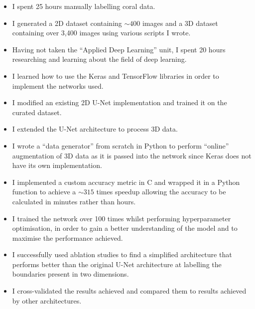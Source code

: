 \begin{itemize}
    \item I spent 25 hours manually labelling coral data.
    \item I generated a 2D dataset containing ${\sim}400$ images and a 3D dataset containing over 3,400 images using various scripts I wrote.
    \item Having not taken the ``Applied Deep Learning'' unit, I spent 20 hours researching and learning about the field of deep learning.
    \item I learned how to use the Keras and TensorFlow libraries in order to implement the networks used.
    \item I modified an existing 2D U-Net implementation and trained it on the curated dataset.
    \item I extended the U-Net architecture to process 3D data.
    \item I wrote a ``data generator'' from scratch in Python to perform ``online'' augmentation of 3D data as it is passed into the network since Keras does not have its own implementation.
    \item I implemented a custom accuracy metric in C and wrapped it in a Python function to achieve a ${\sim}315$ times speedup allowing the accuracy to be calculated in minutes rather than hours.
    \item I trained the network over 100 times whilst performing hyperparameter optimisation, in order to gain a better understanding of the model and to maximise the performance achieved.
    \item I successfully used ablation studies to find a simplified architecture that performs better than the original U-Net architecture at labelling the boundaries present in two dimensions.
    \item I cross-validated the results achieved and compared them to results achieved by other architectures.
\end{itemize}